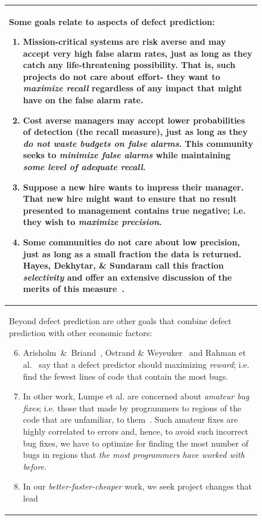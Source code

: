 \documentclass[table, xcdraw, sigconf,review, anonymous]{acmart}
\begin{document}
\begin{figure}[!t]
\small

\begin{tabular}{p{.95\linewidth}}\hline 
\rowcolor{gray!10}
Some goals relate to aspects of defect prediction:
\begin{enumerate}[leftmargin=0.4cm]
 
\item
Mission-critical systems are risk averse and may accept very high false alarm rates,
just as long as they catch any life-threatening possibility. That is, such projects
do not care about effort- they want to {\em maximize recall} regardless of any impact
that might have on the false alarm rate.
\item
Cost averse managers may accept lower probabilities of
detection (the recall measure), just as long as they {\em do not waste budgets on false alarms}. This community
seeks to {\em minimize false alarms} while maintaining {\em some level of adequate recall}.
\item  Suppose a new hire wants
 to impress their manager. That
 new hire might want to ensure that no result presented to  management contains  true negative;
i.e. they wish to {\em maximize precision}.
\item
Some communities do not care about   low precision,
just as long as a small fraction the data is returned. Hayes, Dekhytar, \& Sundaram call this fraction
{\em selectivity} and offer an
extensive discussion of the merits of this measure~\cite{hayes06}.
\end{enumerate}
\\ \hline
Beyond defect prediction are other goals that combine defect prediction with other economic
factors:
\begin{enumerate}[leftmargin=0.4cm]
\setcounter{enumi}{5}
\item
Arisholm~\&~Briand~\cite{arisholm06},  Ostrand \& Weyeuker~\cite{ostrand04} and Rahman et al.~\cite{rahman12}
say that a defect predictor should maximizing {\em reward}; i.e. find the fewest lines of code
that contain the most bugs.
\item In other work, Lumpe et al. are concerned about
 {\em amateur  bug fixes}; i.e. those that made by programmers to
regions of the code that are unfamiliar, to them~\cite{me11f}.
Such amateur fixes are highly correlated to errors and, hence, to
avoid such incorrect bug fixes, we have to optimize
for finding the most number of bugs in regions that {\em the most programmers have worked with before}.
\item In our  {\em better-faster-cheaper} work, we seek  project changes that lead

\end{enumerate}
\end{tabular}
\end{figure}
\end{document}
